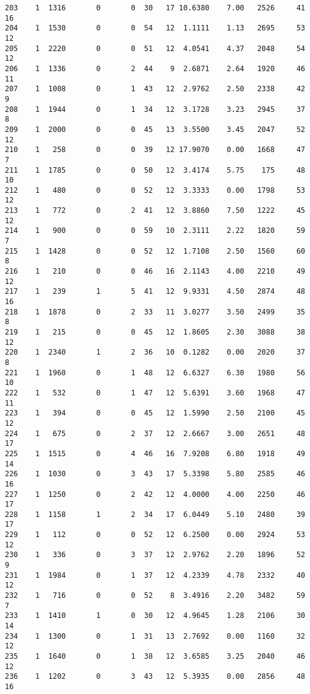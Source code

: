 \documentclass[
  letterpaper,
  DIV=11,
  numbers=noendperiod]{scrreprt}
\begin{document}
\begin{verbatim}
203    1  1316       0       0  30   17 10.6380    7.00   2526     41      16
204    1  1530       0       0  54   12  1.1111    1.13   2695     53      12
205    1  2220       0       0  51   12  4.0541    4.37   2048     54      12
206    1  1336       0       2  44    9  2.6871    2.64   1920     46      11
207    1  1008       0       1  43   12  2.9762    2.50   2338     42       9
208    1  1944       0       1  34   12  3.1728    3.23   2945     37       8
209    1  2000       0       0  45   13  3.5500    3.45   2047     52      12
210    1   258       0       0  39   12 17.9070    0.00   1668     47       7
211    1  1785       0       0  50   12  3.4174    5.75    175     48      10
212    1   480       0       0  52   12  3.3333    0.00   1798     53      12
213    1   772       0       2  41   12  3.8860    7.50   1222     45      12
214    1   900       0       0  59   10  2.3111    2.22   1820     59       7
215    1  1428       0       0  52   12  1.7108    2.50   1560     60       8
216    1   210       0       0  46   16  2.1143    4.00   2210     49      12
217    1   239       1       5  41   12  9.9331    4.50   2874     48      16
218    1  1878       0       2  33   11  3.0277    3.50   2499     35       8
219    1   215       0       0  45   12  1.8605    2.30   3088     38      12
220    1  2340       1       2  36   10  0.1282    0.00   2020     37       8
221    1  1960       0       1  48   12  6.6327    6.30   1980     56      10
222    1   532       0       1  47   12  5.6391    3.60   1968     47      11
223    1   394       0       0  45   12  1.5990    2.50   2100     45      12
224    1   675       0       2  37   12  2.6667    3.00   2651     48      17
225    1  1515       0       4  46   16  7.9208    6.80   1918     49      14
226    1  1030       0       3  43   17  5.3398    5.80   2585     46      16
227    1  1250       0       2  42   12  4.0000    4.00   2250     46      17
228    1  1158       1       2  34   17  6.0449    5.10   2480     39      17
229    1   112       0       0  52   12  6.2500    0.00   2924     53      12
230    1   336       0       3  37   12  2.9762    2.20   1896     52       9
231    1  1984       0       1  37   12  4.2339    4.78   2332     40      12
232    1   716       0       0  52    8  3.4916    2.20   3482     59       7
233    1  1410       1       0  30   12  4.9645    1.28   2106     30      14
234    1  1300       0       1  31   13  2.7692    0.00   1160     32      12
235    1  1640       0       1  38   12  3.6585    3.25   2040     46      12
236    1  1202       0       3  43   12  5.3935    0.00   2856     48      16

\end{verbatim}
\end{document}
